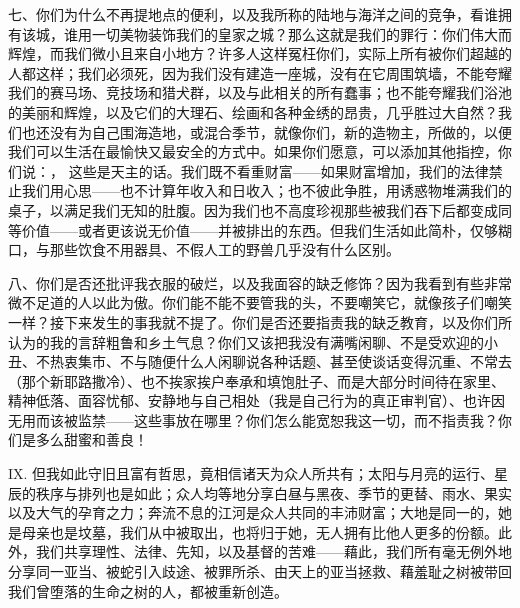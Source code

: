 七、你们为什么不再提地点的便利，以及我所称的陆地与海洋之间的竞争，看谁拥有该城，谁用一切美物装饰我们的皇家之城？那么这就是我们的罪行：你们伟大而辉煌，而我们微小且来自小地方？许多人这样冤枉你们，实际上所有被你们超越的人都这样；我们必须死，因为我们没有建造一座城，没有在它周围筑墙，不能夸耀我们的赛马场、竞技场和猎犬群，以及与此相关的所有蠢事；也不能夸耀我们浴池的美丽和辉煌，以及它们的大理石、绘画和各种金绣的昂贵，几乎胜过大自然？我们也还没有为自己围海造地，或混合季节，就像你们，新的造物主，所做的，以便我们可以生活在最愉快又最安全的方式中。如果你们愿意，可以添加其他指控，你们说：， 这些是天主的话。我们既不看重财富——如果财富增加，我们的法律禁止我们用心思——也不计算年收入和日收入；也不彼此争胜，用诱惑物堆满我们的桌子，以满足我们无知的肚腹。因为我们也不高度珍视那些被我们吞下后都变成同等价值——或者更该说无价值——并被排出的东西。但我们生活如此简朴，仅够糊口，与那些饮食不用器具、不假人工的野兽几乎没有什么区别。\par

八、你们是否还批评我衣服的破烂，以及我面容的缺乏修饰？因为我看到有些非常微不足道的人以此为傲。你们能不能不要管我的头，不要嘲笑它，就像孩子们嘲笑一样？接下来发生的事我就不提了。你们是否还要指责我的缺乏教育，以及你们所认为的我的言辞粗鲁和乡土气息？你们又该把我没有满嘴闲聊、不是受欢迎的小丑、不热衷集市、不与随便什么人闲聊说各种话题、甚至使谈话变得沉重、不常去（那个新耶路撒冷）、也不挨家挨户奉承和填饱肚子、而是大部分时间待在家里、精神低落、面容忧郁、安静地与自己相处（我是自己行为的真正审判官）、也许因无用而该被监禁——这些事放在哪里？你们怎么能宽恕我这一切，而不指责我？你们是多么甜蜜和善良！\par

IX. 但我如此守旧且富有哲思，竟相信诸天为众人所共有；太阳与月亮的运行、星辰的秩序与排列也是如此；众人均等地分享白昼与黑夜、季节的更替、雨水、果实以及大气的孕育之力；奔流不息的江河是众人共同的丰沛财富；大地是同一的，她是母亲也是坟墓，我们从中被取出，也将归于她，无人拥有比他人更多的份额。此外，我们共享理性、法律、先知，以及基督的苦难——藉此，我们所有毫无例外地分享同一亚当、被蛇引入歧途、被罪所杀、由天上的亚当拯救、藉羞耻之树被带回我们曾堕落的生命之树的人，都被重新创造。\par

